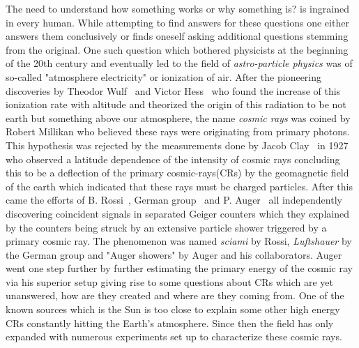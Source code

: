 The need to understand how something works or why something is? is ingrained in every human. While attempting to find answers for these questions one either answers them conclusively or finds oneself asking additional questions stemming from the original. One such question which bothered physicists at the beginning of the 20th century and eventually led to the field of \textit{astro-particle physics} was of so-called "atmosphere electricity" or ionization of air. After the pioneering discoveries by Theodor Wulf~\cite{article_Wulf} and Victor Hess~\cite{Hess:1912srp} who found the increase of this ionization rate with altitude and theorized the origin of this radiation to be not earth but something above our atmosphere, the name \textit{cosmic rays} was coined by Robert Millikan who believed these rays were originating from primary photons. This hypothesis was rejected by the measurements done by Jacob Clay~\cite{Clay:1927I,Clay:1928II} in 1927 who observed a latitude dependence of the intensity of cosmic rays concluding this to be a deflection of the primary cosmic-rays(CRs) by the geomagnetic field of the earth which indicated that these rays must be charged particles. After this came the efforts of B. Rossi~\cite{rossi1933eigenschaften}, German group~\cite{schmeiser1938harten} and P. Auger~\cite{RevModPhys.11.288} all independently discovering coincident signals in separated Geiger counters which they explained by the counters being struck by an extensive particle shower triggered by a primary cosmic ray. The phenomenon was named \textit{sciami} by Rossi, \textit{Luftshauer} by the German group and "Auger showers" by Auger and his collaborators. Auger went one step further by further estimating the primary energy of the cosmic ray via his superior setup giving rise to some questions about CRs which are yet unanswered, how are they created and where are they coming from. One of the known sources which is the Sun is too close to explain some other high energy CRs constantly hitting the Earth's atmosphere. Since then the field has only expanded with numerous experiments set up to characterize these cosmic rays. 

